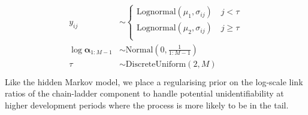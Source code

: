\begin{align}
\begin{split}
	y_{ij} &\sim 
	\begin{cases}
		\mathrm{Lognormal}(\mu_{1}, \sigma_{ij}) \quad j < \tau\\
		\mathrm{Lognormal}(\mu_{2}, \sigma_{ij}) \quad j \geq \tau\\
	\end{cases}\\
    \log \bm{\alpha}_{1:M - 1} &\sim \mathrm{Normal}(0, \scriptstyle{\frac{1}{1:M-1}})\\
    \tau &\sim \mathrm{DiscreteUniform}(2, M)\\
\end{split}
\end{align}
%
Like the hidden Markov model, we place a regularising
prior on the log-scale link ratios of the chain-ladder
component to handle potential unidentifiability
at higher development periods where the process
is more likely to be in the tail.
